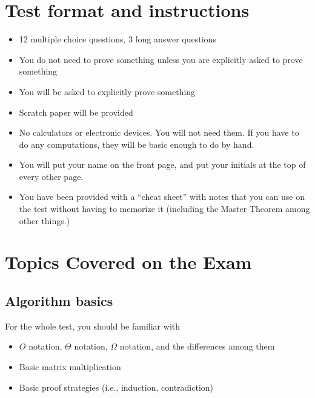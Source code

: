 \documentclass[11  pt]{exam}
\begin{document}
	
	
	
	\section{Test format and instructions}
	
	\begin{itemize}
		\item 12 multiple choice questions, 3 long answer questions
		\item You do not need to prove something unless you are explicitly asked to prove something
		\item You will be asked to explicitly prove something 
		\item Scratch paper will be provided
		\item No calculators or electronic devices. You will not need them. If you have to do any computations, they will be basic enough to do by hand.
		\item You will put your name on the front page, and put your initials at the top of every other page.
		\item You have been provided with a ``cheat sheet'' with notes that you can use on the test without having to memorize it (including the Master Theorem among other things.) 
	\end{itemize}
	
	\newpage 
	
	\section{Topics Covered on the Exam}
	
	\subsection{Algorithm basics}
	For the whole test, you should be familiar with
	\begin{itemize}
		\item $O$ notation, $\Theta$ notation, $\Omega$ notation, and the differences among them
		\item Basic matrix multiplication
		\item Basic proof strategies (i.e., induction, contradiction)
	\end{itemize}
	
\end{document}
